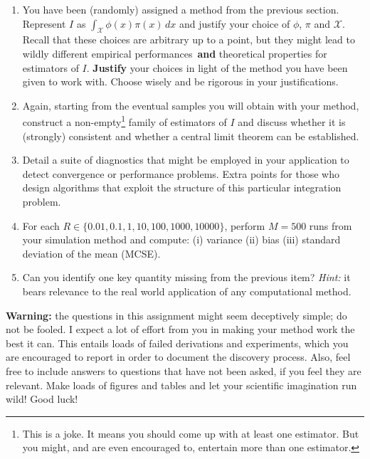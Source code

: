 \documentclass[a4paper,10pt, notitlepage]{report}
\begin{document}
\begin{enumerate}
 \item You have been (randomly) assigned a method from the previous section.
 Represent $I$ as $\int_{\mathcal{X}} \phi(x)\pi(x)\,dx$ and justify your choice of $\phi$, $\pi$ and $\mathcal{X}$.
 Recall that these choices are arbitrary up to a point, but they might lead to wildly different empirical performances~\textbf{and} theoretical properties for estimators of $I$.
 \textbf{Justify} your choices in light of the method you have been given to work with.
 Choose wisely and be rigorous in your justifications.
 \item Again, starting from the eventual samples you will obtain with your method, construct a non-empty\footnote{This is a joke. It means you should come up with at least one estimator. But you might, and are even encouraged to, entertain more than one estimator.} family of estimators of $I$ and discuss whether it is (strongly) consistent and whether a central limit theorem can be established.
 \item Detail a suite of diagnostics that might be employed in your application to detect convergence or performance problems.
 Extra points for those who design algorithms that exploit the structure of this particular integration problem. 
 \item For each $R \in \{0.01, 0.1, 1, 10, 100, 1000, 10000\}$, perform $M=500$ runs from your simulation method and compute: (i) variance (ii) bias (iii) standard deviation of the mean (MCSE).
 \item Can you identify one key quantity missing from the previous item?
 \textit{Hint:} it bears relevance to the real world application of any computational method.
\end{enumerate}

\textbf{Warning:} the questions in this assignment might seem deceptively simple; do not be fooled. I expect a lot of effort from you in making your method work the best it can. This entails loads of failed derivations and experiments, which you are encouraged to report in order to document the discovery process.
Also, feel free to include answers to questions that have not been asked, if you feel they are relevant. 
Make loads of figures and tables and let your scientific imagination run wild! 
Good luck! 

% 
% 
% 
\end{document}
